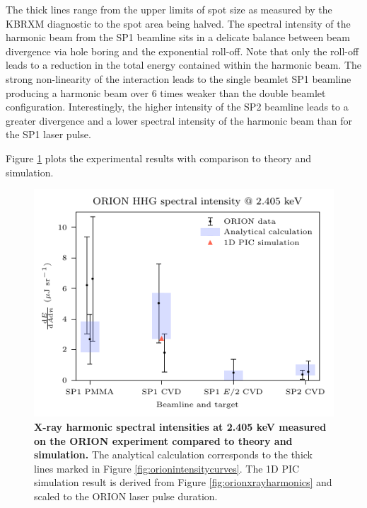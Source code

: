 The thick lines range from the upper limits of spot size as measured by the KBRXM diagnostic to the spot area being halved. The spectral intensity of the harmonic beam from the SP1 beamline sits in a delicate balance between beam divergence via hole boring and the exponential roll-off. Note that only the roll-off leads to a reduction in the total energy contained within the harmonic beam. The strong non-linearity of the interaction leads to the single beamlet SP1 beamline producing a harmonic beam over 6 times weaker than the double beamlet configuration. Interestingly, the higher intensity of the SP2 beamline leads to a greater divergence and a lower spectral intensity of the harmonic beam than for the SP1 laser pulse.

Figure \ref{fig:orionexperimentresults} plots the experimental results with comparison to theory and simulation. 
\begin{figure}
	\centering
	\includegraphics{figures/orion/orion_experiment_results}
	\caption[X-ray harmonic intensities measured on the ORION experiment compared to theory and simulation.]{\textbf{X-ray harmonic spectral intensities at 2.405 keV measured on the ORION experiment compared to theory and simulation.} The analytical calculation corresponds to the thick lines marked in Figure \ref{fig:orionintensitycurves}. The 1D PIC simulation result is derived from Figure \ref{fig:orionxrayharmonics} and scaled to the ORION laser pulse duration.}
	\label{fig:orionexperimentresults}
\end{figure}
